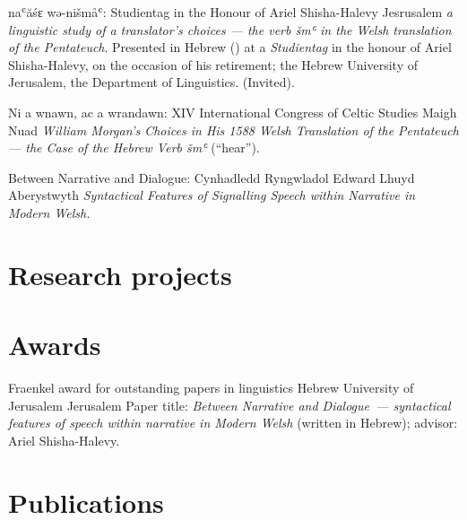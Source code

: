 	{na{ʿ}ăśɛ wə-nišmå{ʿ}:}
	{Studientag in the Honour of Ariel Shisha-Halevy}
	{Jesrusalem}
	{}
	{\emph{a linguistic study of a translator’s choices — the verb \emph{šm{ʿ}} in the Welsh translation of the Pentateuch}. Presented in Hebrew () at a \emph{Studientag} in the honour of Ariel Shisha-Halevy, on the occasion of his retirement; the Hebrew University of Jerusalem, the Department of Linguistics. (Invited).}

	{Ni a wnawn, ac a wrandawn:}
	{XIV International Congress of Celtic Studies}
	{Maigh Nuad}
	{}
	{\emph{William Morgan's Choices in His 1588 Welsh Translation of the Pentateuch — the Case of the Hebrew Verb \emph{šm{ʿ}}} (“hear”).}

	{Between Narrative and Dialogue:}
	{Cynhadledd Ryngwladol Edward Lhuyd}
	{Aberystwyth}
	{}
	{\emph{Syntactical Features of Signalling Speech within Narrative in Modern Welsh.}}



\section{Research projects}




\section{Awards}

	{Fraenkel award for outstanding papers in linguistics}
	{Hebrew University of Jerusalem}
	{Jerusalem}
	{}
	{Paper title: \emph{Between Narrative and Dialogue~— syntactical features of speech within narrative in Modern Welsh} (written in Hebrew); advisor: Ariel Shisha-Halevy.}



\section{Publications}

\nocite{*}
\printbibliography[heading=none]



